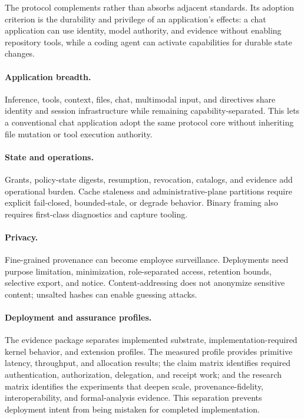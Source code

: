 \documentclass[10pt]{article}
\begin{document}
The protocol complements rather than absorbs adjacent standards. Its adoption criterion is the durability and privilege of an application's effects: a chat application can use identity, model authority, and evidence without enabling repository tools, while a coding agent can activate capabilities for durable state changes.

\paragraph{Application breadth.}
Inference, tools, context, files, chat, multimodal input, and directives share identity and session infrastructure while remaining capability-separated. This lets a conventional chat application adopt the same protocol core without inheriting file mutation or tool execution authority.

\paragraph{State and operations.}
Grants, policy-state digests, resumption, revocation, catalogs, and evidence add operational burden. Cache staleness and administrative-plane partitions require explicit fail-closed, bounded-stale, or degrade behavior. Binary framing also requires first-class diagnostics and capture tooling.

\paragraph{Privacy.}
Fine-grained provenance can become employee surveillance. Deployments need purpose limitation, minimization, role-separated access, retention bounds, selective export, and notice. Content-addressing does not anonymize sensitive content; unsalted hashes can enable guessing attacks.

\paragraph{Deployment and assurance profiles.}
The evidence package separates implemented substrate, implementation-required kernel behavior, and extension profiles. The measured profile provides primitive latency, throughput, and allocation results; the claim matrix identifies required authentication, authorization, delegation, and receipt work; and the research matrix identifies the experiments that deepen scale, provenance-fidelity, interoperability, and formal-analysis evidence. This separation prevents deployment intent from being mistaken for completed implementation.
\end{document}
